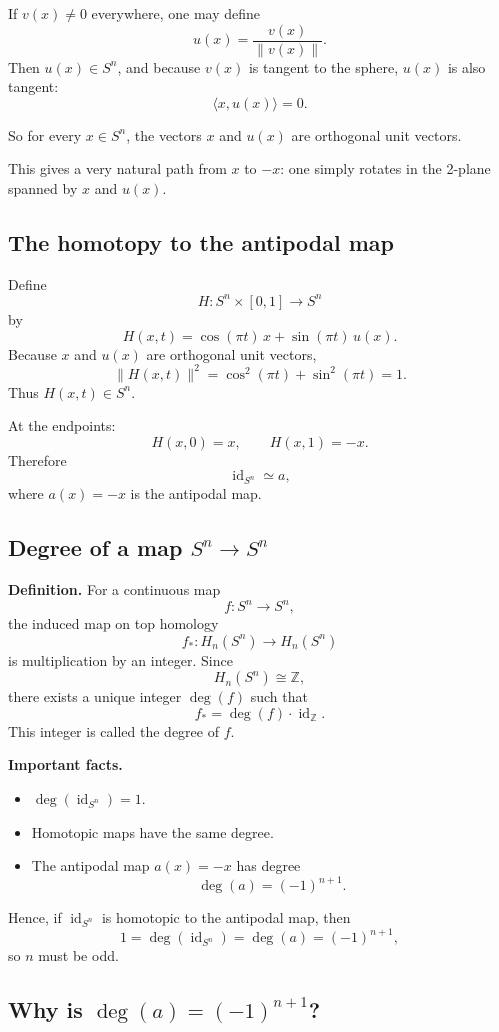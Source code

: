 \documentclass[12pt,a4paper]{article}
\theoremstyle{notespace}
\begin{document}
If \(v(x)\neq 0\) everywhere, one may define
\[
u(x)=\frac{v(x)}{\|v(x)\|}.
\]
Then \(u(x)\in S^n\), and because \(v(x)\) is tangent to the sphere, \(u(x)\) is also tangent:
\[
\langle x,u(x)\rangle =0.
\]

So for every \(x\in S^n\), the vectors \(x\) and \(u(x)\) are orthogonal unit vectors.

This gives a very natural path from \(x\) to \(-x\): one simply rotates in the 2-plane spanned by \(x\) and \(u(x)\).

\subsection{The homotopy to the antipodal map}

Define
\[
H:S^n\times [0,1]\to S^n
\]
by
\[
H(x,t)=\cos(\pi t)\,x+\sin(\pi t)\,u(x).
\]
Because \(x\) and \(u(x)\) are orthogonal unit vectors,
\[
\|H(x,t)\|^2=\cos^2(\pi t)+\sin^2(\pi t)=1.
\]
Thus \(H(x,t)\in S^n\).

At the endpoints:
\[
H(x,0)=x,
\qquad
H(x,1)=-x.
\]
Therefore
\[
\operatorname{id}_{S^n}\simeq a,
\]
where \(a(x)=-x\) is the antipodal map.

\subsection{Degree of a map \(S^n\to S^n\)}

\textbf{Definition.}
For a continuous map
\[
f:S^n\to S^n,
\]
the induced map on top homology
\[
f_*:H_n(S^n)\to H_n(S^n)
\]
is multiplication by an integer. Since
\[
H_n(S^n)\cong \mathbb Z,
\]
there exists a unique integer \(\deg(f)\) such that
\[
f_* = \deg(f)\cdot \operatorname{id}_{\mathbb Z}.
\]
This integer is called the degree of \(f\).

\textbf{Important facts.}
\begin{itemize}
	\item \(\deg(\operatorname{id}_{S^n})=1\).
	\item Homotopic maps have the same degree.
	\item The antipodal map \(a(x)=-x\) has degree
	\[
	\deg(a)=(-1)^{n+1}.
	\]
\end{itemize}

Hence, if \(\operatorname{id}_{S^n}\) is homotopic to the antipodal map, then
\[
1=\deg(\operatorname{id}_{S^n})=\deg(a)=(-1)^{n+1},
\]
so \(n\) must be odd.

\subsection{Why is \(\deg(a)=(-1)^{n+1}\)?}
\end{document}
